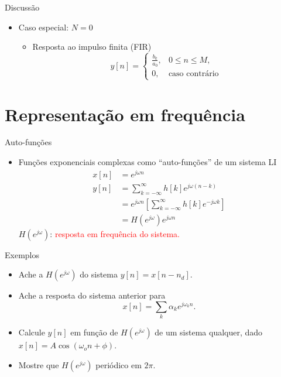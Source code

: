 \begin{slide}[toc=]{Discussão}
   \begin{itemize}
      \item Caso especial: $N=0$
      \begin{itemize}
         \item Resposta ao impulso finita (FIR)
         \begin{equation*}
            y[n]=\begin{cases}
                    \frac{b_k}{a_0}, & 0\leq n \leq M,\\
                    0              , & \text{caso contrário}
                 \end{cases}
         \end{equation*}
      \end{itemize}
   \end{itemize}
\end{slide}


\section[slide=true]{Representação em frequência}
 \begin{slide}[toc=]{Auto-funções}
\begin{itemize}
 \item Funções exponenciais complexas como ``auto-funções'' de um sistema LI
 \begin{align*}
   x[n]&=e^{j\omega n}\\
   y[n]&=\sum_{k=-\infty}^{\infty}h[k]e^{j\omega (n-k)}\\
       &=e^{j\omega n}\left [\sum_{k=-\infty}^{\infty}h[k]e^{-j\omega k} \right ]\\
       &= H(e^{j\omega})e^{j\omega n}
 \end{align*}%
 $H(e^{j\omega})$: \textcolor{red}{resposta em frequência do sistema.}
\end{itemize}
\end{slide}

\begin{slide}[toc=]{Exemplos}
\begin{itemize}
   \item Ache a $H(e^{j\omega})$ do sistema $y[n]=x[n-n_d]$.
   \item Ache a resposta do sistema anterior para \begin{equation*}
                                                     x[n]=\sum_k \alpha_k e^{j\omega_k n}.
                                                    \end{equation*}
   \item Calcule $y[n]$ em função de $H(e^{j\omega})$ de um sistema qualquer, dado $x[n]=A\cos(\omega_o n+\phi)$.
   \item Mostre que $H(e^{j\omega})$  periódico em $2\pi$.
\end{itemize}
\end{slide}

